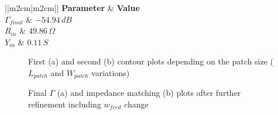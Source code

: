 \documentclass[12pt,a4paper,twocolumn]{article}
\begin{document}
{\begin{table}
	\begin{center}
		{\selectfont	\begin{tabular}{||m{2cm}|m{2cm}||}
				\hline
				\textbf{Parameter} & \textbf{Value}\\
				\hline
				$\Gamma_{final}$ & $-54.94\,dB$\\
				\hline
				$R_{in}$ & $49.86\,\Omega$ \\
				\hline
				$Y_{in}$ & $ 0.11\,S$ \\
				\hline
		\end{tabular}}
		\caption{Final $\Gamma$ and impedance matching values after $w_{feed}$ change}
		\label{table:Gamma and Z}
	\end{center}
\end{table}
\begin{figure}[bt!]
	\begin{subfigure}{0.48\linewidth}
		\def\svgwidth{\linewidth}
		\tiny{}
		\caption{}
		\label{fig:first contour}
	\end{subfigure}
	\hfill
	\begin{subfigure}{0.48\linewidth}
		\def\svgwidth{\linewidth}
		\tiny{}
		\caption{}
		\label{fig:second contour}
	\end{subfigure}
	\caption{First (a) and second (b) contour plots depending on the patch size ($L_{patch}$ and $W_{patch}$ variations)}
\end{figure}


\begin{figure}[bt!]
		\begin{subfigure}{0.45\linewidth}
				\def\svgwidth{\linewidth}
			\tiny{}
					\caption{}
		\end{subfigure}
	\hfill
		\begin{subfigure}{0.48\linewidth}
				\def\svgwidth{\linewidth}
			\tiny{}
					\caption{}
		\end{subfigure}
		\caption{Final $\Gamma$ (a) and impedance matching (b) plots after further refinement including $w_{feed}$ change}
		\label{fig:Gamma and Z}
\end{figure}

}
\end{document}
